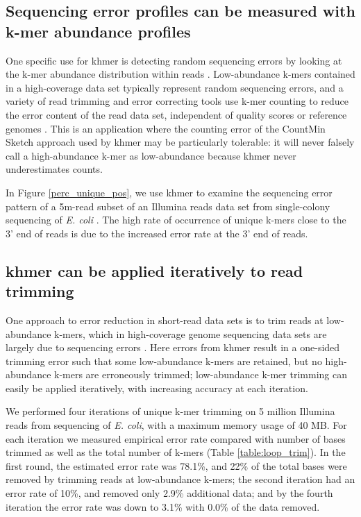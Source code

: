 \documentclass{article}
\begin{document}
\subsection{Sequencing error profiles can be measured with k-mer abundance
profiles}

One specific use for khmer is detecting random sequencing errors by
looking at the k-mer abundance distribution within reads \cite{Medvedev2011}.
Low-abundance k-mers contained in a high-coverage data set typically
represent random sequencing errors, and a variety of read trimming and
error correcting tools use k-mer counting to reduce the error content
of the read data set, independent of quality scores or reference
genomes \cite{Kelley2010}.  This is an application where the counting
error of the CountMin Sketch approach used by khmer may be
particularly tolerable: it will never falsely call a high-abundance k-mer as low-abundance because khmer never underestimates counts.


In Figure \ref{perc_unique_pos}, we use khmer to examine the
sequencing error pattern of a 5m-read subset of an Illumina reads
data set from single-colony sequencing of {\em E. coli}
\cite{pubmed21926975}.  The high rate of occurrence of unique k-mers
close to the 3' end of reads is due to the increased error rate at the
3' end of reads.

\subsection{khmer can be applied iteratively to read trimming}

One approach to error reduction in short-read data sets is to trim
reads at low-abundance k-mers, which in high-coverage genome
sequencing data sets are largely due to sequencing errors \cite{Kelley2010}.
Here errors from khmer result in a one-sided trimming
error such that some low-abundance k-mers are retained, but no
high-abundance k-mers are erroneously trimmed; low-abundance k-mer
trimming can easily be applied iteratively, with increasing accuracy
at each iteration.

We performed four iterations of unique k-mer trimming on 5 million
Illumina reads from sequencing of {\em E. coli}, with a maximum memory
usage of 40 MB.  For each iteration we measured empirical error rate
compared with number of bases trimmed as well as the total number of
k-mers
(Table \ref{table:loop_trim}).
In the first round, the estimated error
rate was 78.1\%, and 22\% of the total bases were removed by trimming
reads at low-abundance k-mers; the second iteration had an error
rate of 10\%, and removed only 2.9\% additional data; and by
the fourth iteration the error rate was down to 3.1\% with 0.0\% of the data removed.
\end{document}
